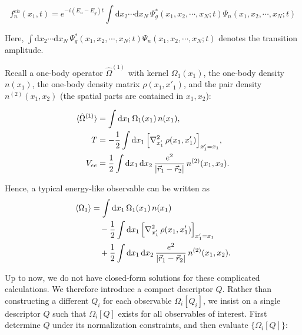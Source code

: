 \begin{equation}
    f_n^{eh}(x_1,t)=e^{-i(E_n-E_g)t}\int\mathrm{d}x_2\cdots\mathrm{d}x_N\,\Psi_g^*(x_1,x_2,\cdots,x_N;t)\Psi_n(x_1,x_2,\cdots,x_N;t)
\label{mod_transition_one-body}
\end{equation}

Here, $\int\mathrm{d}x_2\cdots\mathrm{d}x_N\,\Psi_g^*(x_1,x_2,\cdots,x_N;t)\Psi_n(x_1,x_2,\cdots,x_N;t)$ denotes the transition amplitude.

Recall a one-body operator $\hat{\Omega}^{(1)}$ with kernel $\Omega_1(x_1)$,
the one-body density $n(x_1)$,
the one-body density matrix $\rho(x_1,x'_1)$,
and the pair density $n^{(2)}(x_1,x_2)$ (the spatial parts are contained in $x_1,x_2$):

\begin{equation}
\begin{aligned}
    \braket{\hat{\Omega}^{(1)}}  &= \int \mathrm{d}x_1\, \Omega_1(x_1)\, n(x_1),\\
    T &= -\frac{1}{2}\int \mathrm{d}x_1\,
    \Big[\nabla_{x'_1}^{2}\,\rho(x_1,x'_1)\Big]_{x'_1=x_1},\\
    V_{ee} &= \frac{1}{2}\int \mathrm{d}x_1\,\mathrm{d}x_2\,
    \frac{e^2}{|\vec{r}_1-\vec{r}_2|}\, n^{(2)}(x_1,x_2).
\end{aligned}
\label{one-body_operator_with_kernel}
\end{equation}

Hence, a typical energy-like observable can be written as
\begin{equation}
\begin{aligned}
    \braket{\Omega_1}
    &= \int \mathrm{d}x_1\, \Omega_1(x_1)\, n(x_1) \\
    &\quad - \frac{1}{2}\int \mathrm{d}x_1\,
    \Big[\nabla_{x'_1}^{2}\,\rho(x_1,x'_1)\Big]_{x'_1=x_1} \\
    &\quad + \frac{1}{2}\int \mathrm{d}x_1\,\mathrm{d}x_2\,
    \frac{e^2}{|\vec{r}_1-\vec{r}_2|}\, n^{(2)}(x_1,x_2).
\end{aligned}
\label{mod_obs_1}
\end{equation}


Up to now, we do not have closed-form solutions for these complicated calculations. 
We therefore introduce a compact descriptor $Q$. 
Rather than constructing a different $Q_i$ for each observable $\Omega_i[Q_i]$,  we insist on a single descriptor $Q$ such that $\Omega_i[Q]$ exists for all observables of interest. 
First determine $Q$ under its normalization constraints, and then evaluate $\{\Omega_i[Q]\}$: 

